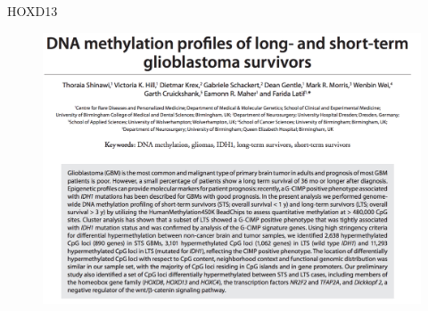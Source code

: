 \documentclass[slidestop,compress,11pt,xcolor=dvipsnames]{beamer}
\begin{document}
\begin{frame}{HOXD13}
\vspace{-0.5cm}
 \begin{figure}[ht!]
  \centering
  \includegraphics[width=1.0\textwidth]{glioma/paper_HOXD13b.png}
 \end{figure}
\end{frame}
\end{document}
